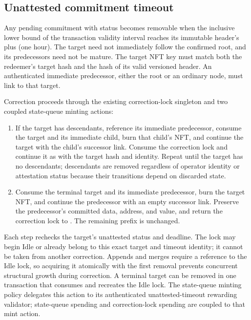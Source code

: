 \documentclass[../midgard.tex]{subfiles}
\begin{document}
\subsection{Unattested commitment timeout}
\label{h:state-queue-unattested-timeout}

Any pending commitment with status  becomes removable when the inclusive lower bound of the transaction validity interval reaches its immutable header's  plus  (one hour).
The target need not immediately follow the confirmed root, and its predecessors need not be mature.
The target NFT key must match both the redeemer's target hash and the hash of its valid versioned header.
An authenticated immediate predecessor, either the root or an ordinary node, must link to that target.

Correction proceeds through the existing correction-lock singleton and two coupled state-queue minting actions:
\begin{enumerate}
    \item If the target has descendants, reference its immediate predecessor, consume the target and its immediate child, burn that child's NFT, and continue the target with the child's successor link.
      Consume the correction lock and continue it as  with the target hash and  identity.
      Repeat until the target has no descendants; descendants are removed regardless of operator identity or attestation status because their transitions depend on discarded state.
    \item Consume the terminal target and its immediate predecessor, burn the target NFT, and continue the predecessor with an empty successor link.
      Preserve the predecessor's committed data, address, and value, and return the correction lock to .
      The remaining prefix is unchanged.
\end{enumerate}
Each step rechecks the target's unattested status and deadline.
The lock may begin Idle or already belong to this exact target and timeout identity; it cannot be taken from another correction.
Appends and merges require a reference to the Idle lock, so acquiring it atomically with the first removal prevents concurrent structural growth during correction.
A terminal target can be removed in one transaction that consumes and recreates the Idle lock.
The state-queue minting policy delegates this action to its authenticated unattested-timeout rewarding validator; state-queue spending and correction-lock spending are coupled to that mint action.
\end{document}
